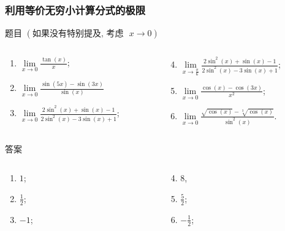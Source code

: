 \documentclass[
10pt,
aspectratio=43,
]{beamer}
\begin{document}
\begin{frame}
	\frametitle{利用等价无穷小计算分式的极限}
	\begin{block}{题目 $(\text{如果没有特别提及, 考虑 }\,\,x\to0)$}
		\begin{columns}[onlytextwidth]
			\begin{column}{0.5\textwidth}
				\begin{enumerate}
					\item $\displaystyle\lim\limits_{x \to 0} \frac{\tan(x)}{x}$;
					\item $\displaystyle\lim\limits_{x \to 0} \frac{\sin(5x) - \sin(3x)}{\sin(x)}$
					\item $\displaystyle\lim\limits_{x \to 0} \frac{2 \sin^2(x) + \sin(x) - 1}{2 \sin^2(x) - 3 \sin(x) + 1}$;
				\end{enumerate}
			\end{column}
			\begin{column}{0.5\textwidth}
				\begin{enumerate}
					\setcounter{enumi}{3}
					\item $\displaystyle\lim\limits_{x \to \frac{\pi}{6}} \frac{2 \sin^2(x) + \sin(x) - 1}{2 \sin^2(x) - 3 \sin(x) + 1}$;
					\item $\displaystyle\lim\limits_{x \to 0} \frac{\cos(x) - \cos(3x)}{x^2}$;
					\item $\displaystyle\lim\limits_{x \to 0} \frac{\sqrt{\cos(x)} - \sqrt[3]{\cos(x)}}{\sin^2(x)}$.
				\end{enumerate}
			\end{column}
		\end{columns}
	\end{block}
	\begin{exampleblock}{答案}
		\begin{columns}[onlytextwidth]
			\begin{column}{0.5\textwidth}
				\begin{enumerate}
					\item $1$;
					      \pause
					\item $\displaystyle\frac12$;
					      \pause
					\item $-1$;
				\end{enumerate}
			\end{column}
			\begin{column}{0.5\textwidth}
				\begin{enumerate}
					\setcounter{enumi}{3}
					\pause
					\item $8$,
					      \pause
					\item $\displaystyle\frac52$;
					      \pause
					\item $\displaystyle-\frac12$;
				\end{enumerate}
			\end{column}
		\end{columns}
	\end{exampleblock}
\end{frame}
\end{document}
